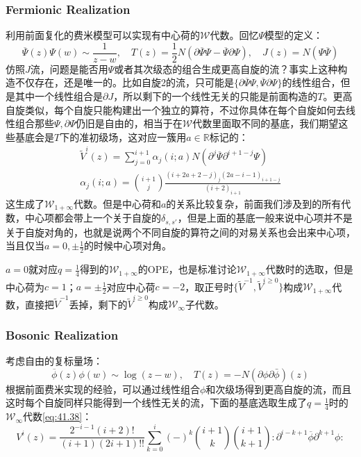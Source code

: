 \subsubsection{Fermionic Realization}
利用前面复化的费米模型可以实现有中心荷的$\mathcal{W}$代数。回忆$\Psi$模型的定义：
\begin{equation}
	\overline{\Psi}(z)\Psi(w)\sim\frac1{z-w},\quad T(z)=\frac12N\left(\partial\overline{\Psi}\Psi-\overline{\Psi}\partial\Psi \right),\quad J(z)=N(\Psi\overline{\Psi})
\end{equation}
仿照$J$流，问题是能否用$\Psi$或者其次级态的组合生成更高自旋的流？事实上这种构造不仅存在，还是唯一的。比如自旋2的流，只可能是$\{\partial\overline{\Psi}\Psi,\overline{\Psi}\partial\Psi \}$的线性组合，但是其中一个线性组合是$\partial J$，所以剩下的一个线性无关的只能是前面构造的$T$。更高自旋类似，每个自旋只能构建出一个独立的算符，不过你具体在每个自旋如何去线性组合那些$\Psi,\partial\Psi$仍旧是自由的，相当于在$\mathcal{W}$代数里面取不同的基底，我们期望这些基底会是$T$下的准初级场，这对应一簇用$a\in\mathbb{R}$标记的：
\begin{equation}\label{41.59}
	\begin{gathered}
		\widetilde{V}^i(z)=\sum_{j=0}^{i+1}\alpha_j(i;a)N\left(\partial^j\overline{\Psi}\partial^{i+1-j}\Psi \right)\\
		\alpha_j(i;a)=\binom{i+1}j\frac{(i+2a+2-j)_j(2a-i-1)_{i+1-j}}{(i+2)_{i+1}}
	\end{gathered}
\end{equation}
这生成了$\mathcal{W}_{1+\infty}$代数。但是中心荷和$a$的关系比较复杂，前面我们涉及到的所有代数，中心项都会带上一个关于自旋的$\delta_{s,s'}$，但是上面的基底一般来说中心项并不是关于自旋对角的，也就是说两个不同自旋的算符之间的对易关系也会出来中心项，当且仅当$a=0,\pm\frac12$的时候中心项对角。

$a=0$就对应$q=\frac14$得到的$\mathcal{W}_{1+\infty}$的OPE，也是标准讨论$\mathcal{W}_{1+\infty}$代数时的选取，但是中心荷为$c=1$；$a=\pm \frac{1}{2}$对应中心荷$c=-2$，取正号时$\{\widetilde{V}^{-1},\widetilde{V}^{i\geq 0}\}$构成$\mathcal{W}_{1+\infty}$代数，直接把$\widetilde{V}^{-1}$丢掉，剩下的$\widetilde{V}^{i\geq 0}$构成$\mathcal{W}_{\infty}$子代数。
\subsubsection{Bosonic Realization}
考虑自由的复标量场：
\begin{equation}
	\overline{\phi}(z)\phi(w)\sim\log(z-w),\quad T(z)=-N(\partial\phi\partial\bar\phi)(z)
\end{equation}
根据前面费米实现的经验，可以通过线性组合$\phi$和次级场得到更高自旋的流，而且这时每个自旋同样只能得到一个线性无关的流，下面的基底选取生成了$q=\frac14$时的$\mathcal{W}_\infty$代数\ref{eq:41.38}：
\begin{equation}
	V^i(z)=\frac{2^{-i-1}(i+2)!}{(i+1)(2i+1)!!}\sum_{k=0}^i(-)^k\binom{i+1}k\binom{i+1}{k+1}:\partial^{i-k+1}\overline{\phi}\partial^{k+1}\phi :
\end{equation}

